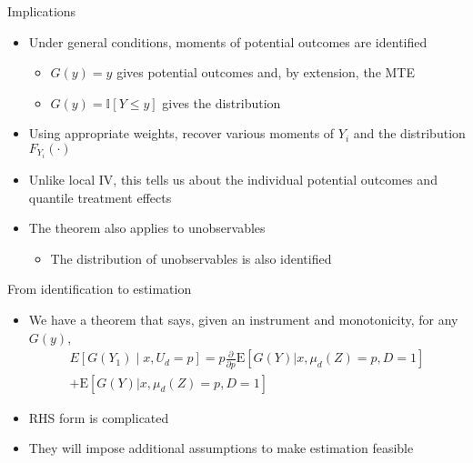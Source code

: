\documentclass{beamer}
\newcommand{\E}{\mathrm{E}} %
\begin{document}
\begin{frame}{Implications}

\begin{itemize}

\item Under general conditions, moments of potential outcomes are
  identified
\begin{itemize}
\item $G(y) = y$ gives potential outcomes and, by extension, the MTE

\item $G(y) = \mathbb{I} \left[ Y \leq y \right]$ gives the
  distribution
\end{itemize}

\pause

\item Using appropriate weights, recover various moments of $Y_i$ and
  the distribution $F_{Y_i}(\cdot)$

\item Unlike local IV, this tells us about the individual potential
  outcomes and quantile treatment effects

\pause

\item The theorem also applies to unobservables
\begin{itemize}
\item The distribution of unobservables is also identified
\end{itemize}

\end{itemize}

\end{frame}


\begin{frame}{From identification to estimation}
  \begin{itemize}
  \item We have a theorem that says, given an instrument and monotonicity, for any $G(y)$,
    \begin{align*}
      E[G(Y_1)\mid x, U_d=p] =   p \frac{\partial}{\partial p} \E\left[ G(Y) |  x, \mu_d(Z) = p, D = 1 \right] \\+  \E \left[ G(Y) | x, \mu_d(Z) = p, D = 1 \right] 
    \end{align*} \pause
  \item RHS form is complicated
    \item They will impose additional assumptions to make estimation feasible
  \end{itemize}


\end{frame}
\end{document}
